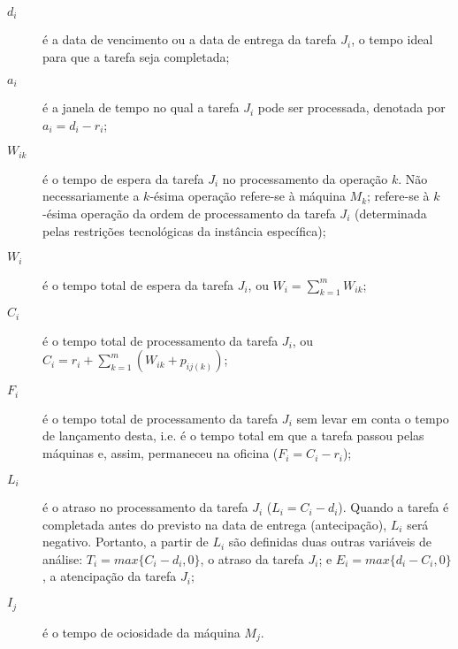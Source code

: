 \documentclass[relatorio,nocolorlinks]{inf-ufg}
\begin{document}
\begin{description}
\item[$d_{i}$] \'{e} a data de vencimento ou a data de entrega da tarefa $J_{i}$, o tempo ideal para que a tarefa seja completada;
\item[$a_{i}$] \'{e} a janela de tempo no qual a tarefa $J_{i}$ pode ser processada, denotada por $a_{i} = d_{i} - r_{i}$;
\item[$W_{ik}$] \'{e} o tempo de espera da tarefa $J_{i}$ no processamento da opera\c{c}\~{a}o $k$. N\~{a}o necessariamente a $k$-\'{e}sima
opera\c{c}\~{a}o refere-se \`{a} m\'{a}quina $M_{k}$; refere-se \`{a} $k$-\'{e}sima opera\c{c}\~{a}o da ordem de processamento da tarefa
$J_{i}$ (determinada pelas restri\c{c}\~{o}es tecnol\'{o}gicas da inst\^{a}ncia espec\'{i}fica);
\item[$W_{i}$] \'{e} o tempo total de espera da tarefa $J_{i}$, ou $W_{i} = \sum_{k=1}^{m}W_{ik}$;
\item[$C_{i}$] \'{e} o tempo total de processamento da tarefa $J_{i}$, ou $C_{i} = r_{i} + \sum_{k=1}^{m}(W_{ik} + p_{ij(k)})$;
\item[$F_{i}$] \'{e} o tempo total de processamento da tarefa $J_{i}$ sem levar em conta o tempo de lan\c{c}amento desta, i.e. \'{e} o tempo
total em que a tarefa passou pelas m\'{a}quinas e, assim, permaneceu na oficina ($F_{i} = C_{i} - r_{i}$);
\item[$L_{i}$] \'{e} o atraso no processamento da tarefa $J_{i}$ ($L_{i} = C_{i} - d_{i}$). Quando a tarefa \'{e} completada antes do previsto
na data de entrega (antecipa\c{c}\~{a}o), $L_{i}$ ser\'{a} negativo. Portanto, a partir de $L_{i}$ s\~{a}o definidas duas outras vari\'{a}veis
de an\'{a}lise:
$T_{i} = \textit{max}\{C_{i} - d_{i} , 0\}$, o atraso da tarefa $J_{i}$; e
$E_{i} = \textit{max}\{d_{i} - C_{i} , 0\}$, a atencipa\c{c}\~{a}o da tarefa $J_{i}$;
\item[$I_{j}$] \'{e} o tempo de ociosidade da m\'{a}quina $M_{j}$.
\end{description}


\end{document}
